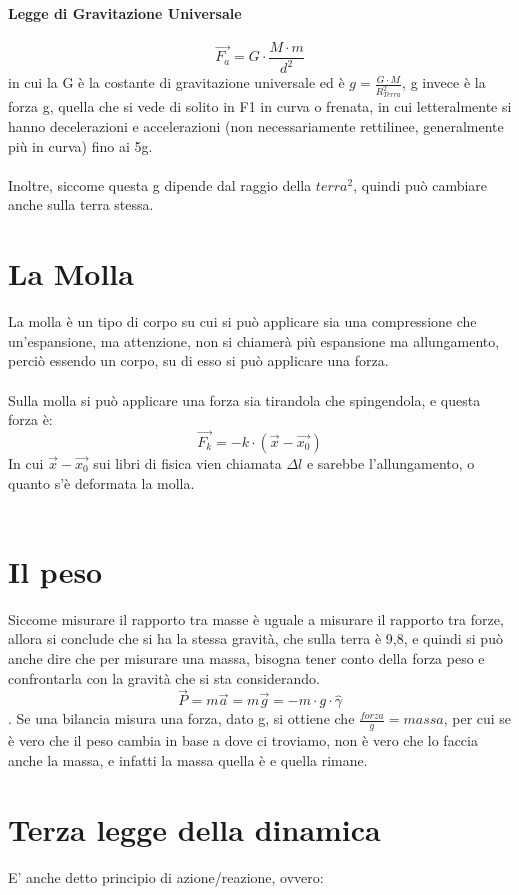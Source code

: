 \documentclass[12pt, a4paper, openany, oneside]{book}
\begin{document}
\paragraph{Legge di Gravitazione Universale}
\[\overrightarrow{F_{a}} = G \cdot \frac{M\cdot m}{d^{2}}\] in cui la G è la
costante di gravitazione universale ed è $g = \frac{G\cdot M}{R_{Terra}^{2}}$, 
g invece è la forza g, quella che si vede di solito in F1 in curva o frenata, in
cui letteralmente si hanno decelerazioni e accelerazioni (non necessariamente 
rettilinee, generalmente più in curva) fino ai 5g. \\ \\
Inoltre, siccome questa g dipende dal raggio della $terra^{2}$, quindi può 
cambiare anche sulla terra stessa.
\section{La Molla}
La molla è un tipo di corpo su cui si può applicare sia una compressione che 
un'espansione, ma attenzione, non si chiamerà più espansione ma allungamento, 
perciò essendo un corpo, su di esso si può applicare una forza. \\ \\
Sulla molla si può applicare una forza sia tirandola che spingendola, e questa
forza è:
\[
\overrightarrow{F_{k}} = -k \cdot (\overrightarrow{x} - \overrightarrow{x_{0}})
\]
In cui $\overrightarrow{x} - \overrightarrow{x_{0}}$ sui libri di fisica vien
chiamata $\Delta l$ e sarebbe l'allungamento, o quanto s'è deformata la molla.
\\ \\
\section{Il peso}
Siccome misurare il rapporto tra masse è uguale a misurare il rapporto tra forze,
allora si conclude che si ha la stessa gravità, che sulla terra è 9,8, e quindi
si può anche dire che per misurare una massa, bisogna tener conto della forza peso 
e confrontarla con la gravità che si sta considerando.
\[\overrightarrow{P} = m \overrightarrow{a} = m \overrightarrow{g} = - m\cdot 
g \cdot \widehat \gamma\]. 
Se una bilancia misura una forza, dato g, si ottiene che $\frac{forza}{g} = massa$,
per cui se è vero che il peso cambia in base a dove ci troviamo, non è vero
che lo faccia anche la massa, e infatti la massa quella è e quella rimane.
\section{Terza legge della dinamica}
E' anche detto principio di azione/reazione, ovvero:
\end{document}
